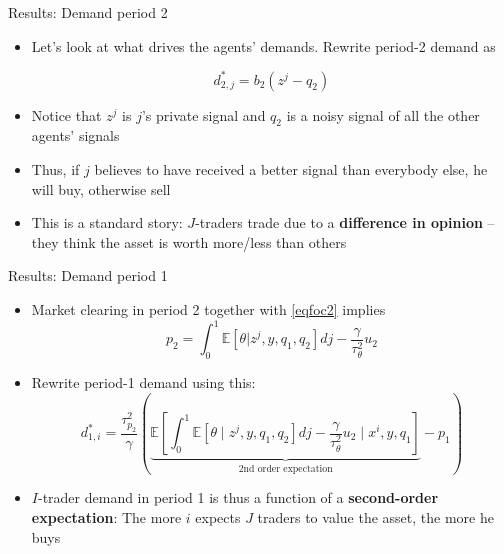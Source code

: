 \documentclass[english,10pt
,aspectratio=169
]{beamer}
\begin{document}
\begin{frame}{Results: Demand period 2}
	\begin{itemize}
		\item Let's look at what drives the agents' demands. Rewrite period-2 demand as 
		\begin{block}{}
			\begin{equation} \label{eqdem2z}
			d^*_{2,j} = b_2 (z^j - q_2) 
			\end{equation}
		\end{block}
		\item Notice that $z^j$ is $j$'s private signal and  $q_2$ is a noisy signal of all the other agents' signals
		\item Thus, if $j$ believes to have received a better signal than everybody else, he will buy, otherwise sell
		\item This is a standard story: $J$-traders trade due to a \textbf{difference in opinion} -- they think the asset is worth more/less than others
	\end{itemize}
\end{frame}


\begin{frame}{Results: Demand period 1}
	\begin{itemize}
		\item Market clearing in period 2 together with \eqref{eqfoc2} implies
		\[
		p_2 = \int_0^1 \mathbb{E}[\theta|z^j, y , q_1, q_2] dj - \frac{\gamma}{\tau^2_\theta}u_2
		\]
		\item Rewrite period-1 demand using this:
		\[
			d^*_{1,i} = \frac{\tau^2_{p_2}}{\gamma} \left( \underbrace{\mathbb{E}\left[ \int_0^1 \mathbb{E}[\theta \mid z^j, y , q_1, q_2 ] dj -\frac{\gamma}{\tau^2_\theta}u_2 \mid x^i,y,q_1 \right]}_{\text{2nd order expectation}}-p_1 \right)
		\]
		\item $I$-trader demand in period 1 is thus a function of a \textbf{second-order expectation}: 
		The more $i$ expects $J$ traders to value the asset, the more he buys 
	\end{itemize}
\end{frame}
\end{document}
